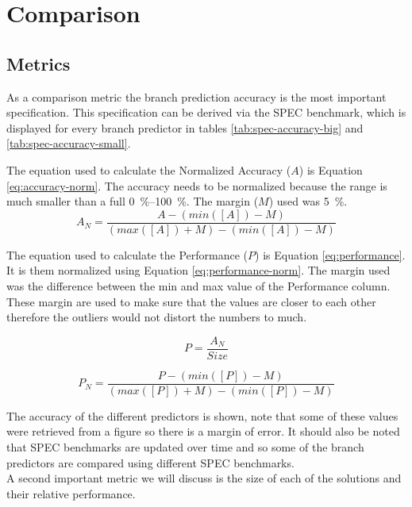 
\section{Comparison}
\subsection{Metrics}
As a comparison metric the branch prediction accuracy is the most important specification.
This specification can be derived via the SPEC benchmark, which is displayed for every branch predictor in tables \ref{tab:spec-accuracy-big} and \ref{tab:spec-accuracy-small}.

The equation used to calculate the Normalized Accuracy ($A$) is Equation \ref{eq:accuracy-norm}.
The accuracy needs to be normalized because the range is much smaller than a full \SIrange{0}{100}{\percent}.
The margin ($M$) used was \SI{5}{\percent}.
\begin{equation}
\label{eq:accuracy-norm}
A_{N} = \frac{A - (min([A]) - M)}{(max([A]) + M)-(min([A]) - M)}
\end{equation}

The equation used to calculate the Performance ($P$) is Equation \ref{eq:performance}.
It is them normalized using Equation \ref{eq:performance-norm}.
The margin used was the difference between the min and max value of the Performance column.
These margin are used to make sure that the values are closer to each other therefore the outliers would not distort the numbers to much.

\begin{equation}
\label{eq:performance}
P = \frac{A_{N}}{Size}
\end{equation}

\begin{equation}
\label{eq:performance-norm}
P_{N} = \frac{P - (min([P]) - M)}{(max([P]) + M)-(min([P]) - M)}
\end{equation}

The accuracy of the different predictors is shown, note that some of these values were retrieved from a figure so there is a margin of error.
It should also be noted that SPEC benchmarks are updated over time and so some of the branch predictors are compared using different SPEC benchmarks.\\
A second important metric we will discuss is the size of each of the solutions and their relative performance.
